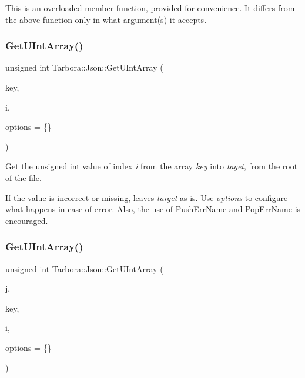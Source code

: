 This is an overloaded member function, provided for convenience. It differs from the above function only in what argument(s) it accepts. \mbox{\label{classTarbora_1_1Json_a1b059c47cbcffaa97e7ce129a05f7682}} 
\subsubsection{\texorpdfstring{Get\+U\+Int\+Array()}{GetUIntArray()}\hspace{0.1cm}{\footnotesize\ttfamily [1/2]}}
{\footnotesize\ttfamily unsigned int Tarbora\+::\+Json\+::\+Get\+U\+Int\+Array (\begin{DoxyParamCaption}\item[{const char $\ast$}]{key,  }\item[{int}]{i,  }\item[{\hyperlink{structTarbora_1_1JsonOptions}{Json\+Options}}]{options = {\ttfamily \{\}} }\end{DoxyParamCaption})}



Get the unsigned int value of index {\itshape i} from the array {\itshape key} into {\itshape taget}, from the root of the file. 

If the value is incorrect or missing, leaves {\itshape target} as is. Use {\itshape options} to configure what happens in case of error. Also, the use of \hyperlink{classTarbora_1_1Json_a061eac4f16dac3b9b3a26a66de0ea8f0}{Push\+Err\+Name} and \hyperlink{classTarbora_1_1Json_a14019f06d3bd76edd6a6e78134519d11}{Pop\+Err\+Name} is encouraged. \mbox{\label{classTarbora_1_1Json_aff4ecfc82b0ca2b07b8f365299dc6b22}} 
\subsubsection{\texorpdfstring{Get\+U\+Int\+Array()}{GetUIntArray()}\hspace{0.1cm}{\footnotesize\ttfamily [2/2]}}
{\footnotesize\ttfamily unsigned int Tarbora\+::\+Json\+::\+Get\+U\+Int\+Array (\begin{DoxyParamCaption}\item[{raw\+\_\+json}]{j,  }\item[{const char $\ast$}]{key,  }\item[{int}]{i,  }\item[{\hyperlink{structTarbora_1_1JsonOptions}{Json\+Options}}]{options = {\ttfamily \{\}} }\end{DoxyParamCaption})}



